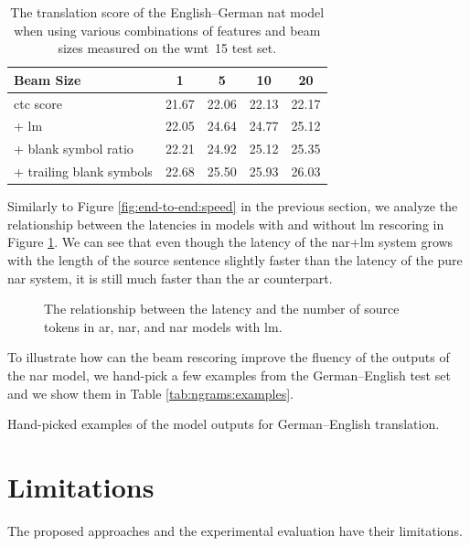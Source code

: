 \begin{table}
  \centering

  \begin{tabular}{lcccc}
    \toprule
    Beam Size &  1 &  5 &  10 &  20 \\
    \midrule
    \acs{ctc} score & 21.67 & 22.06 & 22.13 & 22.17 \\
    \quad + \acs{lm} & 22.05 & 24.64 & 24.77 & 25.12 \\
    \quad + blank symbol ratio & 22.21 & 24.92 & 25.12 & 25.35 \\
    \quad + trailing blank symbols  & 22.68 & 25.50 & 25.93 & 26.03 \\
    \bottomrule
  \end{tabular}

  \caption{The translation score of the English--German \ac{nat} model when
    using various combinations of features and beam sizes measured on the
    \acs{wmt}~15 test set.}%
  \label{tab:ngrams:features}
\end{table}

Similarly to Figure \ref{fig:end-to-end:speed} in the previous section, we
analyze the relationship between the latencies in models with and without
\ac{lm} rescoring in Figure \ref{fig:ngrams:speed}. We can see that even
though the latency of the \acs{nar}+\acs{lm} system grows with the length of
the source sentence slightly faster than the latency of the pure \acs{nar}
system, it is still much faster than the \ac{ar} counterpart.

\begin{figure}
  \centering
  

  \caption{The relationship between the latency and the number of source tokens
    in \acs{ar}, \acs{nar}, and \acs{nar} models with \acs{lm}.}%
  \label{fig:ngrams:speed}
\end{figure}

To illustrate how can the beam rescoring improve the fluency of the outputs of
the \ac{nar} model, we hand-pick a few examples from the German--English test
set and we show them in Table \ref{tab:ngrams:examples}.

\begin{table}
  \centering
  

  \caption{Hand-picked examples of the model outputs for German--English
    translation.}%
  \label{tab:ngrams:examples}
\end{table}



\section{Limitations}

The proposed approaches and the experimental evaluation have their
limitations. 



